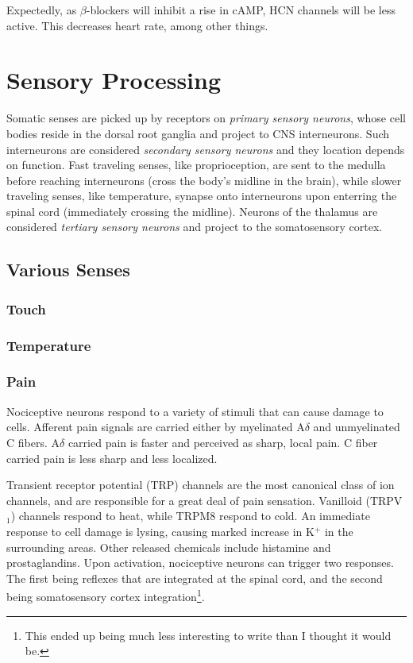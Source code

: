\documentclass[12pt]{report}
\begin{document}
Expectedly, as $\beta$-blockers will inhibit a rise in cAMP, HCN channels will be less active. This decreases heart rate, among other things. 


\chapter{Sensory Processing}

Somatic senses are picked up by receptors on \textit{primary sensory neurons}, whose cell bodies reside in the dorsal root ganglia and project to CNS interneurons. Such interneurons are considered \textit{secondary sensory neurons} and they location depends on function. Fast traveling senses, like proprioception, are sent to the medulla before reaching interneurons (cross the body's midline in the brain), while slower traveling senses, like temperature, synapse onto interneurons upon enterring the spinal cord (immediately crossing the midline). Neurons of the thalamus are considered \textit{tertiary sensory neurons} and project to the somatosensory cortex. 


\section{Various Senses}

\subsection{Touch}

\subsection{Temperature}

\subsection{Pain}
Nociceptive neurons respond to a variety of stimuli that can cause damage to cells. Afferent pain signals are carried either by myelinated A$\delta$ and unmyelinated C fibers. A$\delta$ carried pain is faster and perceived as sharp, local pain. C fiber carried pain is less sharp and less localized.\newline

Transient receptor potential (TRP) channels are the most canonical class of ion channels, and are responsible for a great deal of pain sensation. Vanilloid (TRPV$_1$) channels respond to heat, while TRPM8 respond to cold. An immediate response to cell damage is lysing, causing marked increase in K$^+$ in the surrounding areas. Other released chemicals include histamine and prostaglandins. Upon activation, nociceptive neurons can trigger two responses. The first being reflexes that are integrated at the spinal cord, and the second being somatosensory cortex integration\footnote{This ended up being much less interesting to write than I thought it would be.}. 
\end{document}
